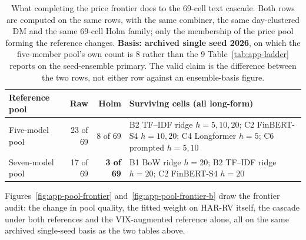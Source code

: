 \begin{table}[htbp]
\centering
\caption[The text cascade against the completed price frontier]{What
completing the price frontier does to the 69-cell text cascade. Both rows
are computed on the same rows, with the same combiner, the same
day-clustered DM and the same 69-cell Holm family; only the membership of
the price pool forming the reference changes. \textbf{Basis: archived
single seed 2026}, on which the five-member pool's own count is 8 rather
than the 9 Table~\ref{tab:app-ladder} reports on the seed-ensemble primary.
The valid claim is the difference between the two rows, not either row
against an ensemble-basis figure.}
\label{tab:app-pool-cascade}
\singlespacing\footnotesize
\begin{tabular}{@{}lrrp{}@{}}
\toprule
Reference pool & Raw & Holm & Surviving cells (all long-form) \\
\midrule
Five-model pool & 23 of 69 & 8 of 69 &
B2 TF--IDF ridge $h{=}5,10,20$; C2 FinBERT-S4 $h{=}10,20$; C4 Longformer
$h{=}5$; C6 prompted $h{=}5,10$ \\
\addlinespace
Seven-model pool & 17 of 69 & \textbf{3 of 69} &
B1 BoW ridge $h{=}20$; B2 TF--IDF ridge $h{=}20$; C2 FinBERT-S4 $h{=}20$ \\
\bottomrule
\end{tabular}
\end{table}

Figures~\ref{fig:app-pool-frontier} and~\ref{fig:app-pool-frontier-b} draw the
frontier audit: the change in pool quality, the fitted weight on HAR-RV itself, the
cascade under both references and the VIX-augmented reference alone, all on the
same archived single-seed basis as the two tables above.

\clearpage

